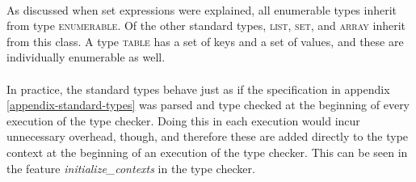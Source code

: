 \paragraph{}
As discussed when set expressions were explained, all enumerable types inherit from type \textsc{enumerable}. Of the other standard types, \textsc{list}, \textsc{set}, and \textsc{array} inherit from this class. A type \textsc{table} has a set of keys and a set of values, and these are individually enumerable as well.
\paragraph{}
In practice, the standard types behave just as if the specification in appendix \ref{appendix-standard-types} was parsed and type checked at the beginning of every execution of the type checker. Doing this in each execution would incur unnecessary overhead, though, and therefore these are added directly to the type context at the beginning of an execution of the type checker. This can be seen in the feature \textit{initialize\_contexts} in the type checker. 